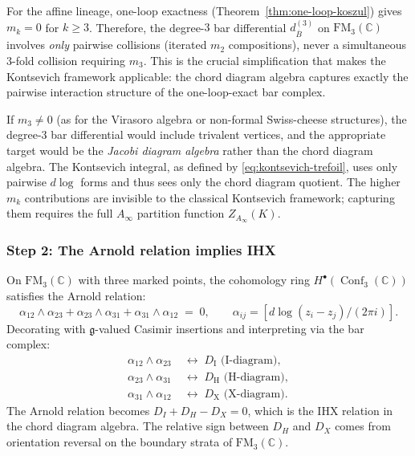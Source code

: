 \documentclass[11pt]{article}
\newcommand{\fg}{\mathfrak{g}}
\newcommand{\barB}{\overline{B}}
\newcommand{\C}{\mathbb{C}}
\newcommand{\FM}{\mathrm{FM}}
\DeclareMathOperator{\Conf}{Conf}
\begin{document}
For the affine lineage, one-loop exactness
(Theorem~\ref{thm:one-loop-koszul}) gives $m_k = 0$ for
$k \ge 3$.  Therefore, the degree-$3$ bar differential
$d_{\barB}^{(3)}$ on $\FM_3(\C)$ involves \emph{only} pairwise
collisions (iterated $m_2$ compositions), never a simultaneous
$3$-fold collision requiring $m_3$.  This is the crucial
simplification that makes the Kontsevich framework applicable:
the chord diagram algebra captures exactly the pairwise
interaction structure of the one-loop-exact bar complex.

\begin{remark}[Why $m_3 = 0$ matters]
If $m_3 \neq 0$ (as for the Virasoro algebra or non-formal
Swiss-cheese structures), the degree-$3$ bar differential would
include trivalent vertices, and the appropriate target would be
the \emph{Jacobi diagram algebra} rather than the chord diagram
algebra.  The Kontsevich integral, as defined by
\eqref{eq:kontsevich-trefoil}, uses only pairwise $d\log$ forms
and thus sees only the chord diagram quotient.  The higher
$m_k$ contributions are invisible to the classical
Kontsevich framework; capturing them requires the full
$A_\infty$ partition function $Z_{A_\infty}(K)$.
\end{remark}

\subsubsection{Step 2: The Arnold relation implies IHX}

On $\FM_3(\C)$ with three marked points, the cohomology ring
$H^\bullet(\Conf_3(\C))$ satisfies the Arnold relation:
\[
  \alpha_{12} \wedge \alpha_{23}
  + \alpha_{23} \wedge \alpha_{31}
  + \alpha_{31} \wedge \alpha_{12}
  \;=\; 0,
  \qquad
  \alpha_{ij} = [d\log(z_i - z_j)/(2\pi i)].
\]
Decorating with $\fg$-valued Casimir insertions and
interpreting via the bar complex:
\begin{align*}
  \alpha_{12} \wedge \alpha_{23}
  &\;\longleftrightarrow\;
  D_{\mathrm{I}} \text{ (I-diagram)}, \\
  \alpha_{23} \wedge \alpha_{31}
  &\;\longleftrightarrow\;
  D_{\mathrm{H}} \text{ (H-diagram)}, \\
  \alpha_{31} \wedge \alpha_{12}
  &\;\longleftrightarrow\;
  D_{\mathrm{X}} \text{ (X-diagram)}.
\end{align*}
The Arnold relation becomes $D_I + D_H - D_X = 0$, which is
the IHX relation in the chord diagram algebra.  The relative
sign between $D_H$ and $D_X$ comes from orientation reversal
on the boundary strata of $\FM_3(\C)$.
\end{document}
